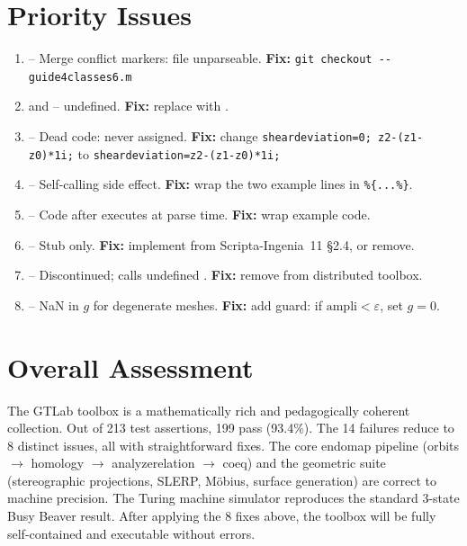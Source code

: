 \section*{Priority Issues}

\begin{enumerate}[label=\textbf{I\arabic*.}]
\item {} -- Merge conflict markers: file unparseable. \textbf{Fix:} \lstinline|git checkout -- guide4classes6.m|
\item {} and  --  undefined. \textbf{Fix:} replace with .
\item {} -- Dead code:  never assigned. \textbf{Fix:} change \lstinline|sheardeviation=0; z2-(z1-z0)*1i;| to \lstinline|sheardeviation=z2-(z1-z0)*1i;|
\item {} -- Self-calling side effect. \textbf{Fix:} wrap the two example lines in \lstinline|%{...%}|.
\item {} -- Code after  executes at parse time. \textbf{Fix:} wrap example code.
\item {} -- Stub only. \textbf{Fix:} implement from Scripta-Ingenia~11 \S2.4, or remove.
\item {} -- Discontinued; calls undefined . \textbf{Fix:} remove from distributed toolbox.
\item {} -- NaN in $g$ for degenerate meshes. \textbf{Fix:} add guard: if $\mathrm{ampli}<\varepsilon$, set $g=0$.
\end{enumerate}

\newpage
\section*{Overall Assessment}

The GTLab toolbox is a mathematically rich and pedagogically coherent collection. Out of 213 test assertions, 199 pass (93.4\%). The 14 failures reduce to 8 distinct issues, all with straightforward fixes. The core endomap pipeline (orbits $\to$ homology $\to$ analyzerelation $\to$ coeq) and the geometric suite (stereographic projections, SLERP, Möbius, surface generation) are correct to machine precision. The Turing machine simulator reproduces the standard 3-state Busy Beaver result. After applying the 8 fixes above, the toolbox will be fully self-contained and executable without errors.

